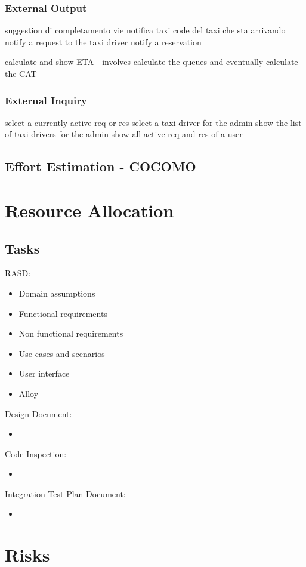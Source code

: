 \documentclass{article}
\begin{document}
\subsubsection{External Output}
suggestion di completamento vie
notifica taxi code del taxi che sta arrivando
notify a request to the taxi driver
notify a reservation

calculate and show ETA - involves calculate the queues and eventually calculate the CAT
\subsubsection{External Inquiry}
select a currently active req or res
select a taxi driver for the admin
show the list of taxi drivers for the admin
show all active req and res of a user
\subsection{Effort Estimation - COCOMO}
\section{Resource Allocation}
\subsection{Tasks}
RASD:
\begin{itemize}
	\item Domain assumptions
	\item Functional requirements
	\item Non functional requirements
	\item Use cases and scenarios
	\item User interface
	\item Alloy
\end{itemize}
Design Document:
\begin{itemize}
	\item
\end{itemize}
Code Inspection:
\begin{itemize}
	\item
\end{itemize}
Integration Test Plan Document:
\begin{itemize}
	\item 
\end{itemize}
\section{Risks}
\end{document}
